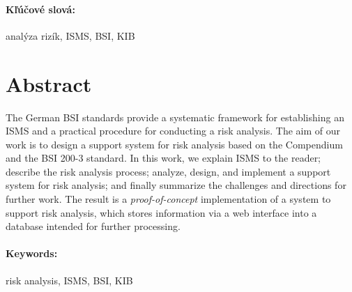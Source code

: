 \documentclass[12pt, twoside]{book}
\begin{document}
\paragraph*{Kľúčové slová:}
analýza rizík, ISMS, BSI, KIB


\newpage 
\section*{Abstract}
The German BSI standards provide a systematic framework for establishing an ISMS and a practical procedure for conducting a risk analysis.
The aim of our work is to design a support system for risk analysis based on the Compendium and the BSI 200-3 standard. In this work, we
explain ISMS to the reader; describe the risk analysis process; analyze, design, and implement a support system for risk
analysis; and finally summarize the challenges and directions for further work. The result is a \emph{proof-of-concept} implementation of
a system to support risk analysis, which stores information via a web interface into a database intended for further processing.

\paragraph*{Keywords:} 
risk analysis, ISMS, BSI, KIB





\cleardoublepage
\tableofcontents



\newpage 

\listoffigures
\listoftables


\mainmatter
\pagestyle{headings}


 
 
 
 
 
 




\newpage	

\backmatter

\thispagestyle{empty}
\clearpage
{}





%
\appendix

\end{document}
